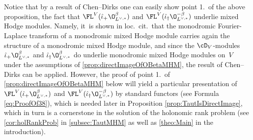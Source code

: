 \begin{rmk}
Notice that by a result of Chen--Dirks \cite[Th.\,1.4]{CD23} one can easily show point 1.\ of the above proposition, \ie the fact that $\FL^V(\hat\iota_+ \O_{L^{\vee,*}}^\beta)$ and $\FL^V(\hat\iota_\dag \O_{L^{\vee,*}}^{-\beta})$
underlie mixed Hodge modules. Namely, it~is shown in loc.\ cit.\ that the monodromic Fourier-Laplace transform of a monodromic mixed Hodge module carries again the structure of a monodromic mixed Hodge module, and since the $\cD_V$\nobreakdash-mod\-ules $\hat\iota_+ \O_{L^{\vee,*}}^\beta$ and $\hat\iota_\dag \O_{L^{\vee,*}}^\beta$ do underlie monodromic mixed Hodge modules on~$V$ under the assumptions of \cref{prop:directImageOfOBetaMHM}, the result of Chen--Dirks can be applied. However, the proof of point 1.\ of \cref{prop:directImageOfOBetaMHM} below will yield a particular presentation of $\FL^V(\hat\iota_+ \O_{L^{\vee,*}}^\beta)$ and $\FL^V(\hat\iota_\dag \O_{L^{\vee,*}}^{-\beta})$ by standard functors (see Formula \eqref{eq:ProofOf38}), which
is needed later in Proposition \ref{prop:TautIsDirectImage}, which in turn is a cornerstone in the solution of the holonomic rank problem (see \cref{cor:holRankProb} in \cref{subsec:TautMHM} as well as \cref{theo:Main} in the introduction).
\end{rmk}

